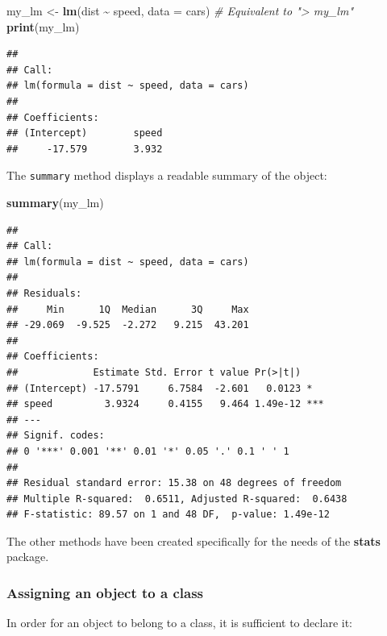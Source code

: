 \documentclass[
  12pt,
  american,
  a4paper,
  extrafontsizes,onecolumn,openright
  ]{memoir}
\newenvironment{Shaded}{\begin{snugshade}}{\end{snugshade}}
\newcommand{\AttributeTok}[1]{\textcolor[rgb]{0.13,0.29,0.53}{#1}}
\newcommand{\CommentTok}[1]{\textcolor[rgb]{0.56,0.35,0.01}{\textit{#1}}}
\newcommand{\FunctionTok}[1]{\textcolor[rgb]{0.13,0.29,0.53}{\textbf{#1}}}
\newcommand{\NormalTok}[1]{#1}
\newcommand{\OtherTok}[1]{\textcolor[rgb]{0.56,0.35,0.01}{#1}}
\newcommand{\SpecialCharTok}[1]{\textcolor[rgb]{0.81,0.36,0.00}{\textbf{#1}}}
\begin{document}
\begin{Shaded}
\begin{Highlighting}[]
\NormalTok{my\_lm }\OtherTok{\textless{}{-}} \FunctionTok{lm}\NormalTok{(dist }\SpecialCharTok{\textasciitilde{}}\NormalTok{ speed, }\AttributeTok{data =}\NormalTok{ cars)}
\CommentTok{\# Equivalent to "\textgreater{} my\_lm"}
\FunctionTok{print}\NormalTok{(my\_lm)}
\end{Highlighting}
\end{Shaded}

\begin{verbatim}
## 
## Call:
## lm(formula = dist ~ speed, data = cars)
## 
## Coefficients:
## (Intercept)        speed  
##     -17.579        3.932
\end{verbatim}

\normalsize

The \texttt{summary} method displays a readable summary of the object:

\scriptsize

\begin{Shaded}
\begin{Highlighting}[]
\FunctionTok{summary}\NormalTok{(my\_lm)}
\end{Highlighting}
\end{Shaded}

\begin{verbatim}
## 
## Call:
## lm(formula = dist ~ speed, data = cars)
## 
## Residuals:
##     Min      1Q  Median      3Q     Max 
## -29.069  -9.525  -2.272   9.215  43.201 
## 
## Coefficients:
##             Estimate Std. Error t value Pr(>|t|)    
## (Intercept) -17.5791     6.7584  -2.601   0.0123 *  
## speed         3.9324     0.4155   9.464 1.49e-12 ***
## ---
## Signif. codes:  
## 0 '***' 0.001 '**' 0.01 '*' 0.05 '.' 0.1 ' ' 1
## 
## Residual standard error: 15.38 on 48 degrees of freedom
## Multiple R-squared:  0.6511, Adjusted R-squared:  0.6438 
## F-statistic: 89.57 on 1 and 48 DF,  p-value: 1.49e-12
\end{verbatim}

\normalsize

The other methods have been created specifically for the needs of the \textbf{stats} package.

\subsubsection{Assigning an object to a class}\label{assigning-an-object-to-a-class}

In order for an object to belong to a class, it is sufficient to declare it:
\end{document}
